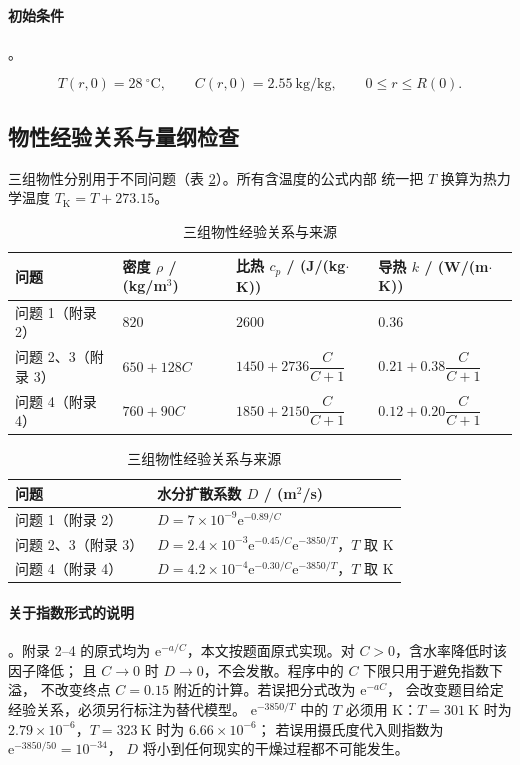 \paragraph{初始条件}。

\begin{equation}
T(r,0)=28\ ^\circ\mathrm{C},\qquad C(r,0)=2.55\ \mathrm{kg/kg},\qquad 0\le r\le R(0).
\end{equation}

\subsection{物性经验关系与量纲检查}

三组物性分别用于不同问题（表 \ref{tab:props}）。所有含温度的公式内部
统一把 $T$ 换算为热力学温度 $T_{\mathrm{K}}=T+273.15$。

\begin{table}[H]
\centering
\caption{三组物性经验关系与来源}\label{tab:props}
\small
\begin{tabular}{@{}llll@{}}
\toprule
问题 & 密度 $\rho$ / (kg/m$^3$) & 比热 $c_p$ / (J/(kg$\cdot$K)) & 导热 $k$ / (W/(m$\cdot$K)) \\
\midrule
问题 1（附录 2） & $820$ & $2600$ & $0.36$ \\
问题 2、3（附录 3） & $650+128C$ & $1450+2736\dfrac{C}{C+1}$ & $0.21+0.38\dfrac{C}{C+1}$ \\
问题 4（附录 4） & $760+90C$ & $1850+2150\dfrac{C}{C+1}$ & $0.12+0.20\dfrac{C}{C+1}$ \\
\bottomrule
\end{tabular}

\vspace{0.4em}
\begin{tabular}{@{}ll@{}}
\toprule
问题 & 水分扩散系数 $D$ / (m$^2$/s) \\
\midrule
问题 1（附录 2） & $D=7\times10^{-9}\mathrm{e}^{-0.89/C}$ \\
问题 2、3（附录 3） & $D=2.4\times10^{-3}\mathrm{e}^{-0.45/C}\mathrm{e}^{-3850/T}$，$T$ 取 K \\
问题 4（附录 4） & $D=4.2\times10^{-4}\mathrm{e}^{-0.30/C}\mathrm{e}^{-3850/T}$，$T$ 取 K \\
\bottomrule
\end{tabular}
\end{table}

\paragraph{关于指数形式的说明}。附录 2--4 的原式均为
$\mathrm{e}^{-a/C}$，本文按题面原式实现。对 $C>0$，含水率降低时该因子降低；
且 $C\to0$ 时 $D\to0$，不会发散。程序中的 $C$ 下限只用于避免指数下溢，
不改变终点 $C=0.15$ 附近的计算。若误把分式改为 $\mathrm{e}^{-aC}$，
会改变题目给定经验关系，必须另行标注为替代模型。
$\mathrm{e}^{-3850/T}$ 中的 $T$ 必须用 K：$T=301\ \mathrm{K}$ 时为
$2.79\times10^{-6}$，$T=323\ \mathrm{K}$ 时为 $6.66\times10^{-6}$；
若误用摄氏度代入则指数为 $\mathrm{e}^{-3850/50}=10^{-34}$，
$D$ 将小到任何现实的干燥过程都不可能发生。

